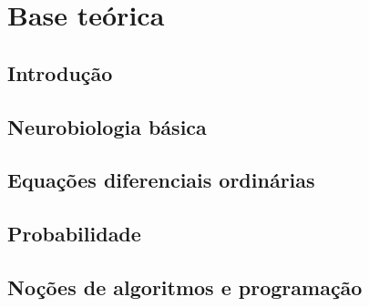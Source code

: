 \chapter{Base teórica}\label{cap:teoria}
\section{Introdução}\label{sec:teoria_intro}

\section{Neurobiologia básica}\label{sec:fisiologia}

\section{Equações diferenciais ordinárias}\label{sec:eqdif}

\section{Probabilidade}\label{sec:probabilidade}

\section{Noções de algoritmos e programação}\label{sec:algoritmo}

